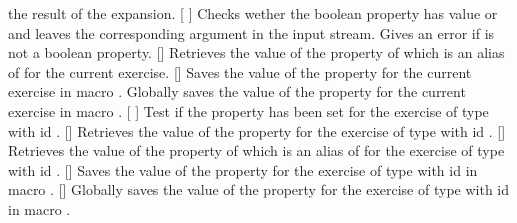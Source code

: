 \documentclass{xsim-manual}
\begin{document}
\begin{commands}
    the result of the expansion.
  \expandable{}[%
    ]
    Checks wether the boolean property  has value 
    or  and leaves the corresponding argument in the input
    stream.  Gives an error if  is not a boolean property.
  \expandable{}[]
    Retrieves the value of the property of which  is an alias
    of for the current exercise.
  []
    Saves the value of the property  for the current
    exercise in macro .
    Globally saves the value of the property  for the current
    exercise in macro .
  [%
    ]
    Test if the property  has been set for the exercise of type
     with id .
  \expandable{}[]
    Retrieves the value of the property  for the exercise of type
     with id .
  \expandable{}[]
    Retrieves the value of the property of which  is an alias
    of for the exercise of type  with id .
  []
    Saves the value of the property  for the exercise of type
     with id  in macro .
  []
    Globally saves the value of the property  for the exercise
    of type  with id  in macro .
\end{commands}
\end{document}
